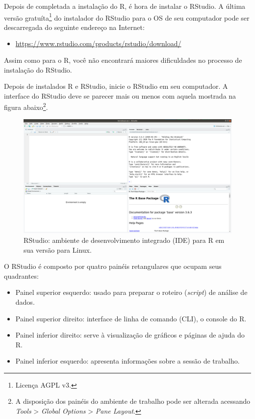 \documentclass[
]{book}
\providecommand{\tightlist}{%
  \setlength{\itemsep}{0pt}\setlength{\parskip}{0pt}}
\begin{document}
Depois de completada a instalação do R, é hora de instalar o RStudio. A última versão gratuíta\footnote{Licença AGPL v3.} do instalador do RStudio para o OS de seu computador pode ser descarregada do seguinte endereço na Internet:

\begin{itemize}
\tightlist
\item
  \url{https://www.rstudio.com/products/rstudio/download/}
\end{itemize}

Assim como para o R, você não encontrará maiores dificuldades no processo de instalação do RStudio.

Depois de instalados R e RStudio, inicie o RStudio em seu computador. A interface do RStudio deve se parecer mais ou menos com aquela mostrada na figura abaixo\footnote{A disposição dos painéis do ambiente de trabalho pode ser alterada acessando \emph{Tools} \textgreater{} \emph{Global Options} \textgreater{} \emph{Pane Layout}.}.

\begin{figure}
\centering
\includegraphics{img/rstudio.png}
\caption{RStudio: ambiente de desenvolvimento integrado (IDE) para R em sua versão para Linux.}
\end{figure}

O RStudio é composto por quatro painéis retangulares que ocupam seus quadrantes:

\begin{itemize}
\tightlist
\item
  Painel superior esquerdo: usado para preparar o roteiro (\emph{script}) de análise de dados.
\item
  Painel superior direito: interface de linha de comando (CLI), o console do R.
\item
  Painel inferior direito: serve à visualização de gráficos e páginas de ajuda do R.
\item
  Painel inferior esquerdo: apresenta informações sobre a sessão de trabalho.
\end{itemize}
\end{document}

